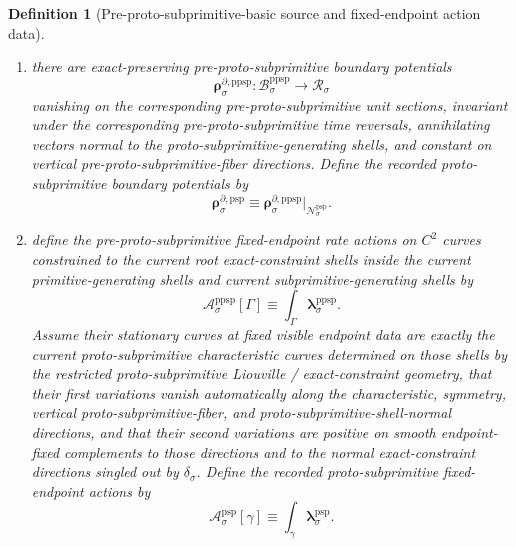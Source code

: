 \documentclass[11pt]{article}
\newcommand{\PhaseReadClass}[1]{\mathscr R_{#1}}
\newcommand{\ConstraintGap}[1]{\delta_{#1}}
\newcommand{\ProtoSubprimSpace}[1]{\mathcal N_{#1}^{\mathrm{psp}}}
\newcommand{\ProtoSubprimRateForm}[1]{\boldsymbol{\lambda}_{#1}^{\mathrm{psp}}}
\newcommand{\ProtoSubprimDensitySource}[1]{\boldsymbol{q}_{#1}^{\mathrm{psp}}}
\newcommand{\ProtoSubprimFluxSource}[1]{\boldsymbol{j}_{#1}^{\mathrm{psp}}}
\newcommand{\ProtoSubprimBoundarySource}[1]{\boldsymbol{\rho}_{#1}^{\partial,\mathrm{psp}}}
\newcommand{\ProtoSubprimAction}[1]{\mathscr A_{#1}^{\mathrm{psp}}}
\newcommand{\PreProtoSubprimSpace}[1]{\mathcal B_{#1}^{\mathrm{ppsp}}}
\newcommand{\PreProtoSubprimRateForm}[1]{\boldsymbol{\lambda}_{#1}^{\mathrm{ppsp}}}
\newcommand{\PreProtoSubprimDensitySource}[1]{\boldsymbol{q}_{#1}^{\mathrm{ppsp}}}
\newcommand{\PreProtoSubprimFluxSource}[1]{\boldsymbol{j}_{#1}^{\mathrm{ppsp}}}
\newcommand{\PreProtoSubprimBoundarySource}[1]{\boldsymbol{\rho}_{#1}^{\partial,\mathrm{ppsp}}}
\newcommand{\PreProtoSubprimAction}[1]{\mathscr A_{#1}^{\mathrm{ppsp}}}
\newtheorem{definition}{Definition}
\begin{document}
\begin{definition}[Pre-proto-subprimitive-basic source and fixed-endpoint action data]
\begin{enumerate}
    \begin{equation}
    \ProtoSubprimDensitySource{\sigma}\equiv \PreProtoSubprimDensitySource{\sigma}|_{\ProtoSubprimSpace{\sigma}},
    \qquad
    \ProtoSubprimFluxSource{\sigma}\equiv \PreProtoSubprimFluxSource{\sigma}|_{\ProtoSubprimSpace{\sigma}}.
    \label{eq:protosubprimitive_sources_from_preprotosubprimitive}
    \end{equation}
    \item there are exact-preserving pre-proto-subprimitive boundary potentials
    \[
    \PreProtoSubprimBoundarySource{\sigma}:\PreProtoSubprimSpace{\sigma}\to\PhaseReadClass{\sigma}
    \]
    vanishing on the corresponding pre-proto-subprimitive unit sections, invariant under the corresponding pre-proto-subprimitive time reversals, annihilating vectors normal to the proto-subprimitive-generating shells, and constant on vertical pre-proto-subprimitive-fiber directions. Define the recorded proto-subprimitive boundary potentials by
    \begin{equation}
    \ProtoSubprimBoundarySource{\sigma}\equiv \PreProtoSubprimBoundarySource{\sigma}|_{\ProtoSubprimSpace{\sigma}}.
    \label{eq:protosubprimitive_boundary_from_preprotosubprimitive}
    \end{equation}
    \item define the pre-proto-subprimitive fixed-endpoint rate actions on \(C^2\) curves constrained to the current root exact-constraint shells inside the current primitive-generating shells and current subprimitive-generating shells by
    \begin{equation}
    \PreProtoSubprimAction{\sigma}[\Gamma]\equiv \int_\Gamma \PreProtoSubprimRateForm{\sigma}.
    \label{eq:preprotosubprimitive_action}
    \end{equation}
    Assume their stationary curves at fixed visible endpoint data are exactly the current proto-subprimitive characteristic curves determined on those shells by the restricted proto-subprimitive Liouville / exact-constraint geometry, that their first variations vanish automatically along the characteristic, symmetry, vertical proto-subprimitive-fiber, and proto-subprimitive-shell-normal directions, and that their second variations are positive on smooth endpoint-fixed complements to those directions and to the normal exact-constraint directions singled out by \(\ConstraintGap{\sigma}\). Define the recorded proto-subprimitive fixed-endpoint actions by
    \begin{equation}
    \ProtoSubprimAction{\sigma}[\gamma]\equiv \int_\gamma \ProtoSubprimRateForm{\sigma}.
    \label{eq:protosubprimitive_action_from_preprotosubprimitive}
    \end{equation}
\end{enumerate}
\end{definition}
\end{document}
